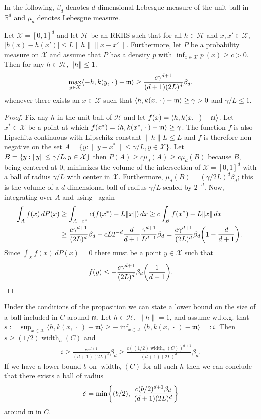 \documentclass[AHL,Unicode,longabstracts,published]{cedram}
\theoremstyle{remark}
\DeclareMathOperator{\diam}{width}
\newcommand{\R}{\mathbb{R}}
\newcommand{\X}{\mathcal{X}}
\newcommand{\cH}{\mathcal{H}}
\newcommand{\mean}{\mathfrak{m}}
\providecommand{\norm}[1]{\left\lVert#1\right\rVert}
\providecommand{\inner}[2]{\left\langle #1,#2\right\rangle}
\let\originalleft\left
\let\originalright\right
\renewcommand{\left}{\mathopen{}\mathclose\bgroup\originalleft}
\renewcommand{\right}{\aftergroup\egroup\originalright}
\begin{document}
In the following, $\beta_d$ denotes $d$-dimensional Lebesgue measure of the unit ball in~$\R^d$ and $\mu_d$ denotes Lebesgue measure.

\begin{prop}\label{prop:Bauer_inspired}
Let $\X = [0,1]^d$ and let $\cH$ be an RKHS such that for all $h\in \cH$ and $x,x' \in \X$, $ | h(x) - h(x')| \leq L \|h\| \|x - x'\|$. Furthermore, let $P$ be a probability measure on $\X$ and assume that $P$ has a density $p$ with $\inf_{x\in \X} p~(x) \geq c > 0$. Then for any $h \in \cH$, $\norm{h} \leq 1$,
\[
\max_{y \in X} \inner{-h}{k(y,\,\cdot\,) - \mean} \geq \frac{c\gamma^{d+1}}{(d+1) (2L)^d} \beta_d.
\]
whenever there exists an $x\in \X$ such that $\inner{h}{k(x,\,\cdot\,)-\mean} \geq \gamma > 0 $ and $\gamma/L \leq 1$.
\end{prop}
\begin{proof}
Fix any $h$ in the unit ball of $\cH$ and let $f(x) = \inner{h}{k(x,\,\cdot\,) - \mean}$. Let $x^*\in \X$ be a point at which $ f(x^*) = \inner{h}{k(x^*,\,\cdot\,)-\mean} \geq \gamma$. The function $f$ is also Lipschitz continuous with Lipschitz-constant $\|h\| L \leq L$ and $f$ is therefore non-negative on the set $A = \{y : \|y-x^*\| \leq \gamma/L, y \in \X\}$. Let $B= \{y: \|y\| \leq \gamma/L,\linebreak y\in \X\}$ then $P(A) \geq c \mu_d(A) \geq c \mu_d(B)$ because $B$, being centered at $0$, minimizes the volume of the intersection of $\X=[0,1]^d$ with a ball of radius $\gamma/L$ with center in $\X$. Furthermore, $\mu_d(B) = (\gamma/2L)^d \beta_d$; this is the volume of a $d$-dimensional ball\pagebreak{} of radius $\gamma/L$ scaled by $2^{-d}$. Now, integrating over $A$ and using~\cite[265G, 265H]{FREM} again
\begin{align*}
\int_A f(x) \,dP(x) &\geq \int_{A-x^*} c (f(x^*) - L\|x\|) \,dx \geq c
\int_{B} f(x^*) - L\|x\| \,dx \\
&\geq \frac{c \gamma^{d+1}}{(2L)^d} \beta_d - cL2^{-d} \frac{d}{d+1} \frac{\gamma^{d+1}}{L^{d+1}} \beta_d = \frac{c\gamma^{d+1}}{(2L)^d} \beta_d \left(1 - \frac{d}{d+1}\right).\
\end{align*}
Since $\int_X f(x) \, dP(x) = 0$ there must be a point $y\in \X$ such that
\[
f(y) \leq -
\frac{c\gamma^{d+1}}{(2L)^d} \beta_d \left(\frac{1}{d+1}\right).\qedhere
\]
\end{proof}

Under the conditions of the proposition we can state a lower bound on the size of a ball included in $C$ around $\mean$. Let $h\in \cH$, $\|h\|=1$, and assume w.l.o.g. that $s := \sup_{x\in \X} \langle h, k(x,\,\cdot\,) - \mean \rangle
\geq - \inf_{x\in \X} \langle h,k(x,\,\cdot\,) - \mean \rangle =: i$. Then $s \geq (1/2) \diam_h(C)$ and
\begin{align}\label{eq:width_lower_bnd}
i \geq \frac{c s^{d+1}}{(d+1) (2L)^d} \beta_d \geq \frac{c ((1/2)\diam_h(C))^{d+1}}{(d+1) (2L)^d} \beta_d.
\end{align}
If we have a lower bound $b$ on $\diam_h(C)$ for all such $h$ then we can conclude that there exists a ball of radius
\[
\delta = \min \left\{(b/2),\; \frac{c (b/2)^{d+1}\beta_d}{(d+1) (2L)^d} \right\}
\]
around $\mean$ in $C$.
\end{document}
